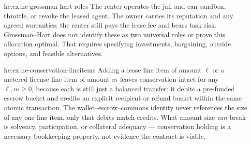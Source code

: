 \begin{pdSolution}{he:ex:he-grossman-hart-roles}
The renter operates the jail and can sandbox, throttle, or revoke the leased
agent. The owner carries its reputation and any agreed warranties; the renter
still pays the lease fee and bears task risk. Grossman--Hart does not identify
these as two universal roles or prove this allocation optimal. That requires
specifying investments, bargaining, outside options, and feasible alternatives.
\end{pdSolution}
\begin{pdSolution}{he:ex:he-conservation-lineitems}
Adding a lease line item of amount $\ell$ or a metered-license line item of
amount $m$ leaves conservation intact for any $\ell,m\ge0$, because each is still
just a balanced transfer: it debits a pre-funded escrow bucket and credits an
explicit recipient or refund bucket within the same atomic transaction. The
wallet--escrow--commons identity never references the size of any one line item,
only that debits match credits. What amount size \emph{can} break is solvency,
participation, or collateral adequacy --- conservation holding is a necessary
bookkeeping property, not evidence the contract is viable.
\end{pdSolution}
